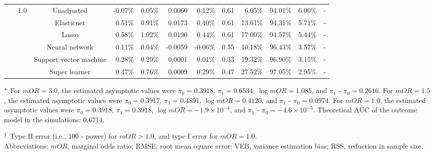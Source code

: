 \documentclass{article}
\begin{document}
\begin{center}
\begin{table}[!ht]
\begin{tabular*}{\textwidth}{@{\extracolsep\fill}c|c|c|rrrr|rrrrr}
        ~ & \multirow{7}{*}{1.0} & Unadjusted & -0.07\% & 0.05\% & 0.0060 & 0.12\% & 0.61 & 6.05\% & 94.01\% & 6.00\% & \multicolumn{1}{c}{-} \\ 
        ~ & ~ & Elasticnet & 0.51\% & 0.91\% & 0.0173 & 0.40\% & 0.61 & 13.61\% & 94.31\% & 5.71\% & \multicolumn{1}{c}{-}  \\ 
        ~ & ~ & Lasso & 0.58\% & 1.02\% & 0.0190 & 0.44\% & 0.61 & 17.00\% & 94.57\% & 5.44\% & \multicolumn{1}{c}{-} \\
        ~ & ~ & Neural network & 0.11\% & 0.04\% & -0.0059 & -0.06\% & 0.55 & 10.18\% & 96.43\% & 3.57\% & \multicolumn{1}{c}{-} \\ 
        ~ & ~ & Support vector machine & 0.28\% & 0.29\% & 0.0001 & 0.01\% & 0.33 & 19.32\% & 96.90\% & 3.11\% & \multicolumn{1}{c}{-} \\ 
        ~ & ~ & Super learner & 0.47\% & 0.76\% & 0.0009 & 0.29\% & 0.47 & 27.52\% & 97.05\% & 2.95\% & \multicolumn{1}{c}{-} \\  
\bottomrule
\end{tabular*}
\begin{tablenotes}
\item[$^{\rm *}$] For $mOR=3.0$, the estimated asymptotic values were $\pi_0 = 0.3918$,  $\pi_1 = 0.6534 $,  $\log mOR = 1.085$,  and $\pi_1$ - $\pi_0 = 0.2616$.
For $mOR=1.5$,  the estimated asymptotic values were $\pi_0 = 0.3917$,  $\pi_1 = 0.4891$,  $\log mOR = 0.4120$,  and $\pi_1$ - $\pi_0 = 0.0974$.
For $mOR=1.0$, the estimated asymptotic values were $\pi_0 = 0.3918$,  $\pi_1 = 0.3918$,  $\log mOR = -1.9\times 10^{-4}$,  and  $\pi_1$ - $\pi_0 = -4.6\times 10^{-5}$. Theoretical AUC of the outcome model in the simulations: 0.6714.
\item[$^{\rm \dagger}$]Type II error (i.e., 100 - power) for $mOR>1.0$, and type I error for $mOR=1.0$.\\
Abbreviations:  $mOR$, marginal odds ratio; RMSE, root mean square error; VEB, variance estimation bias; RSS,  reduction in sample size.
\end{tablenotes}
\end{table}
\end{center}
\end{document}
